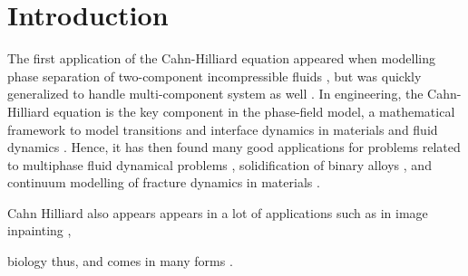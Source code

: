 \section{Introduction}\label{sec:introduction}



The first application of the Cahn-Hilliard equation appeared when modelling phase separation of two-component incompressible fluids \cite{cahn1958free, cahn1959free, cahn1961spinodal}, but was quickly generalized to handle multi-component system as well \cite{bosch2015fractional, eyre1993systems, toth2016phase}. In engineering, the Cahn-Hilliard equation is the key component in
the phase-field model, a mathematical framework to model transitions and interface dynamics in materials and fluid dynamics \cite{steinbach2009phase, chen2002phase}.
Hence, it has then found many good applications for problems related to
multiphase fluid dynamical problems \cite{badalassi2003computation, li2016lattice, kim2012phase, shen2010phase}, solidification of binary alloys \cite{kim1999phase, echebarria2004quantitative}, and continuum modelling of fracture dynamics in
materials \cite{kuhn2010continuum, li2015phase}.

Cahn Hilliard also appears appears in a lot of applications such as in image inpainting \cite{bertozzi2006inpainting, burger2009cahn, bosch2015fractional},

biology \cite{bressloff2014stochastic} thus, and comes in many forms \cite{miranville2017cahn}.







